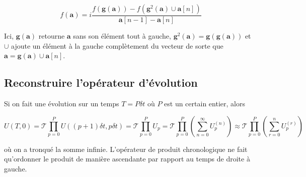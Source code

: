 \begin{equation}
    f(\boldsymbol{a}) = i\frac{f(\boldsymbol{g}(\boldsymbol{a})) - f(\boldsymbol{g}^2(\boldsymbol{a}) \cup \boldsymbol{a}[n])}{\boldsymbol{a}[n-1] - \boldsymbol{a}[n]}
\end{equation}

Ici, $\boldsymbol{g}(\boldsymbol{a})$ retourne $\boldsymbol{a}$ sans son élément tout à gauche, $\boldsymbol{g}^2(\boldsymbol{a}) = \boldsymbol{g}(\boldsymbol{g}(\boldsymbol{a}))$ et $\cup$ ajoute un élément à la gauche complètement du vecteur de sorte que $\boldsymbol{a} = \boldsymbol{g}(\boldsymbol{a}) \cup \boldsymbol{a}[n]$. 



\subsection{Reconstruire l'opérateur d'évolution}
Si on fait une évolution sur un temps $T = P\delta t$ où $P$ est un certain entier, alors 

\begin{equation*}
    U(T,0) = \mathcal{T}\prod_{p=0}^{P}U((p+1)\delta t, p\delta t) = \mathcal{T}\prod_{p=0}^{P} U_p = \mathcal{T}\prod_{p=0}^{P}\left(\sum_{n=0}^{\infty}U_p^{(n)}\right) \approx  \mathcal{T}\prod_{p=0}^{P}\left(\sum_{r=0}^{n}U_p^{(r)}\right)
\end{equation*}

où on a tronqué la somme infinie. L'opérateur de produit chronologique ne fait qu'ordonner le produit de manière ascendante par rapport au temps de droite à gauche.






